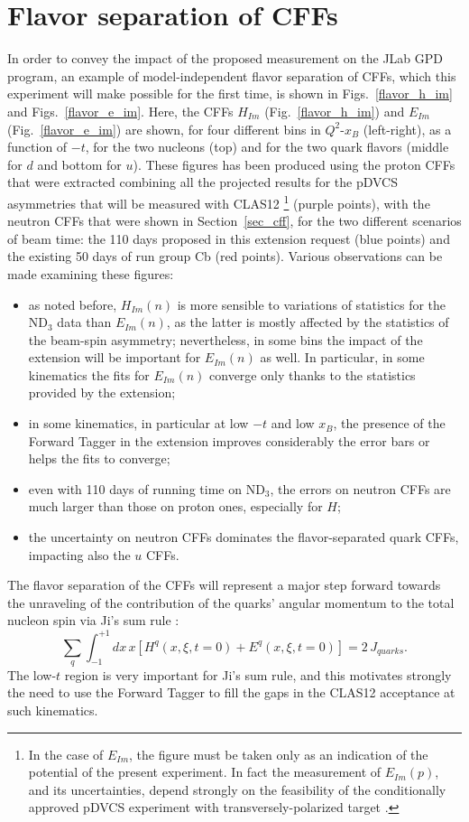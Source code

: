 \section{Flavor separation of CFFs}
In order to convey the impact of the proposed measurement on the JLab GPD program, an example of model-independent flavor separation of CFFs, which this experiment will make possible for the first time, is shown in Figs.~\ref{flavor_h_im} and Figs.~\ref{flavor_e_im}. Here, the CFFs $H_{Im}$ (Fig.~\ref{flavor_h_im}) and $E_{Im}$ (Fig.~\ref{flavor_e_im}) are shown, for four different bins in $Q^2$-$x_B$ (left-right), as a function of $-t$, for the two nucleons (top) and for the two quark flavors (middle for $d$ and bottom for $u$). These figures has been produced using the proton CFFs that were extracted combining all the projected results for the pDVCS asymmetries that will be measured with CLAS12 \cite{mick_herve}\footnote{In the case of $E_{Im}$, the figure must be taken only as an indication of the potential of the present experiment. In fact the measurement of $E_{Im}(p)$, and its uncertainties, depend strongly on the feasibility of the conditionally approved pDVCS experiment with transversely-polarized target \cite{E1212010}.} (purple points), with the neutron CFFs that were shown in Section~\ref{sec_cff}, for the two different scenarios of beam time: the 110 days proposed in this extension request (blue points) and the existing 50 days of run group Cb (red points). 
Various observations can be made examining these figures: 
\begin{itemize}
\item{as noted before, $H_{Im}(n)$ is more sensible to variations of statistics for the ND$_3$ data than $E_{Im}(n)$, as the latter is mostly affected by the statistics of the beam-spin asymmetry; nevertheless, in some bins the impact of the extension will be important for $E_{Im}(n)$ as well. In particular, in some kinematics the fits for $E_{Im}(n)$ converge only thanks to the statistics provided by the extension;}
\item{in some kinematics, in particular at low $-t$ and low $x_B$, the presence of the Forward Tagger in the extension improves considerably the error bars or helps the fits to converge;}
\item{even with 110 days of running time on ND$_3$, the errors on neutron CFFs are much larger than those on proton ones, especially for $H$;}
\item{the uncertainty on neutron CFFs dominates the flavor-separated quark CFFs, impacting also the $u$ CFFs.}
\end{itemize}
The flavor separation of the CFFs will represent a major step forward towards the unraveling of the contribution of the quarks' angular momentum to the total nucleon spin via Ji's sum rule \cite{ji}: 
\begin{equation}
        \sum_{q}\int_{-1}^{+1}dx \, x[H^{q}(x,\xi,t=0)+E^{q}(x,\xi,t=0)]=2\, J_{quarks}.
        \label{eq_ji_rule}
\end{equation}
The low-$t$ region is very important for Ji's sum rule, and this motivates strongly the need to use the Forward Tagger to fill the gaps in the CLAS12 acceptance at such kinematics. 

